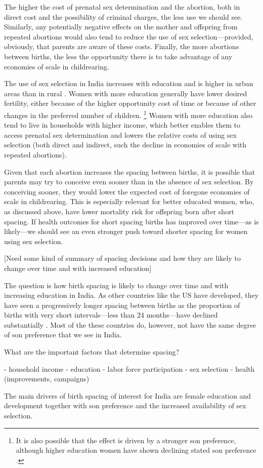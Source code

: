 The higher the cost of prenatal sex determination and the abortion, both in direct cost
and the possibility of criminal charges, the less use we should see.
Similarly, any potentially negative effects on the mother and offspring from repeated
abortions would also tend to reduce the use of sex selection---provided, obviously, that
parents are aware of these costs.
Finally, the more abortions between births, the less the opportunity there is to take
advantage of any economies of scale in childrearing.


The use of sex selection in India increases with education and is higher in urban
areas than in rural
\citep{das_gupta97,retherford03b,jha06,Guilmoto2009a,Bongaarts2013,Portner2015b,
Jayachandran2017}.
Women with more education generally have lower desired fertility, either because of the
higher opportunity cost of time or because of other changes in the preferred number of
children.%
\footnote{
It is also possible that the effect is driven by a stronger son preference, although 
higher education women have shown declining stated son preference \citep{bhat03,pande07}.
}
Women with more education also tend to live in households with higher income,
which better enables them to access prenatal sex determination and lowers the relative
costs of using sex selection (both direct and indirect, such the decline in 
economies of scale with repeated abortions).

Given that each abortion increases the spacing between births, it is possible that
parents may try to conceive even sooner than in the absence of sex selection.
By conceiving sooner, they would lower the expected cost of foregone economies of scale in 
childrearing.
This is especially relevant for better educated women, who, as discussed above, have
lower mortality risk for offspring born after short spacing.
If health outcomes for short spacing births has improved over time---as is likely---we
should see an even stronger push toward shorter spacing for women using sex selection.


[Need some kind of summary of spacing decisions and how they are likely to change
over time and with increased education]

The question is how birth spacing is likely to change over time and with increasing
education in India.
As other countries like the US have developed, they have seen a progressively longer 
spacing between births as the proportion of births with very short intervals---less than 
24 months---have declined substantially \citep{Hotz1997}.
Most of the these countries do, however, not have the same degree of son preference that
we see in India.

What are the important factors that determine spacing?

- household income
- education
- labor force participation
- sex selection
- health (improvements, campaigns)

The main drivers of birth spacing of interest for India are female education and
development together with son preference and the increased availability of sex selection.

